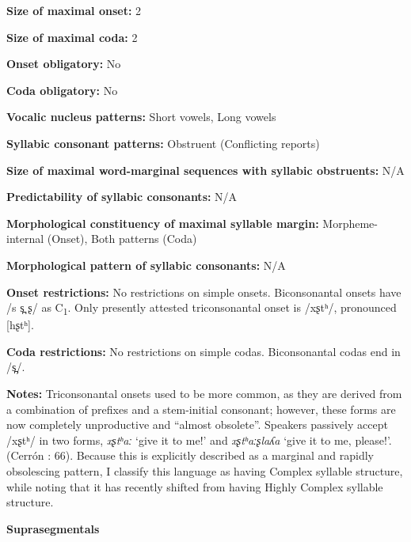 \textbf{Size of maximal onset:} 2



\textbf{Size of maximal coda:} 2



\textbf{Onset obligatory:} No



\textbf{Coda obligatory:} No



\textbf{Vocalic nucleus patterns:} Short vowels, Long vowels



\textbf{Syllabic consonant patterns:} Obstruent (Conflicting reports)



\textbf{Size of maximal word{}-marginal sequences with syllabic obstruents:} N/A



\textbf{Predictability of syllabic consonants:} N/A



\textbf{Morphological constituency of maximal syllable margin:} Morpheme-internal (Onset), Both patterns (Coda)



\textbf{Morphological pattern of syllabic consonants:} N/A



\textbf{Onset restrictions:} No restrictions on simple onsets. Biconsonantal onsets have /s s̪ ʂ/ as C\textsubscript{1}. Only presently attested triconsonantal onset is /xʂtʰ/, pronounced [hʂtʰ].



\textbf{Coda restrictions:} No restrictions on simple codas. Biconsonantal codas end in /s̪/.



\textbf{Notes:} Triconsonantal onsets used to be more common, as they are derived from a combination of prefixes and a stem-initial consonant; however, these forms are now completely unproductive and “almost obsolete”. Speakers passively accept /xʂtʰ/ in two forms, \textit{xʂtʰaː} ‘give it to me!’ and \textit{xʂtʰaːʂlaʎa} ‘give it to me, please!’. (Cerrón \citealt{Palomino2006}: 66). Because this is explicitly described as a marginal and rapidly obsolescing pattern, I classify this language as having Complex syllable structure, while noting that it has recently shifted from having Highly Complex syllable structure.



\textbf{Suprasegmentals}



